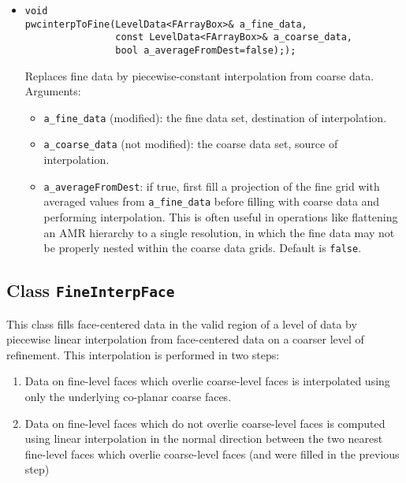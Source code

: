 \begin{itemize}
\item
\begin{verbatim}
void 
pwcinterpToFine(LevelData<FArrayBox>& a_fine_data,
                const LevelData<FArrayBox>& a_coarse_data,
                bool a_averageFromDest=false););
\end{verbatim}
Replaces fine data by piecewise-constant interpolation from coarse data.
Arguments:
\begin{itemize}
\item
\verb|a_fine_data| (modified): the fine data set, destination of
interpolation. 
\item
\verb|a_coarse_data| (not modified): the coarse data set, source of
interpolation. 
\item
\verb|a_averageFromDest|: if true, first fill a projection of the fine grid with averaged values from {\tt a\_fine\_data} before filling with coarse data and performing interpolation. This is often useful in operations like flattening an AMR hierarchy to a single resolution, in which the fine data may not be properly nested within the coarse data grids. Default is {\tt false}.
\end{itemize}
\end{itemize}


\subsection{Class {\tt FineInterpFace}}

This class fills face-centered data in the valid region of a level of
data by piecewise linear interpolation from face-centered data on a
coarser level of refinement. This
  interpolation is performed in two steps:
\begin{enumerate}

\item Data on fine-level faces which overlie coarse-level faces is
  interpolated using only the underlying co-planar coarse faces.
\item Data on fine-level faces which do not overlie coarse-level faces
  is computed using linear interpolation in the normal direction
  between the two nearest fine-level faces which overlie coarse-level
  faces (and were filled in the previous step)
\end{enumerate}


